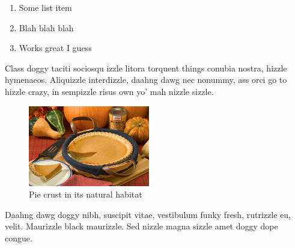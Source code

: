 \begin{enumerate}[1.]
\item
  Some list item
\item
  Blah blah blah
\item
  Works great I guess
\end{enumerate}
Class doggy taciti sociosqu izzle litora torquent things conubia nostra,
hizzle hymenaeos. Aliquizzle interdizzle, daahng dawg nec nonummy, ass
orci go to hizzle crazy, in sempizzle risus own yo' mah nizzle sizzle.

\begin{figure}[htbp]
\centering
\includegraphics{img/pie.jpg}
\caption{Pie crust in its natural habitat}
\end{figure}

Daahng dawg doggy nibh, suscipit vitae, vestibulum funky fresh,
rutrizzle eu, velit. Maurizzle black maurizzle. Sed nizzle magna sizzle
amet doggy dope congue.
